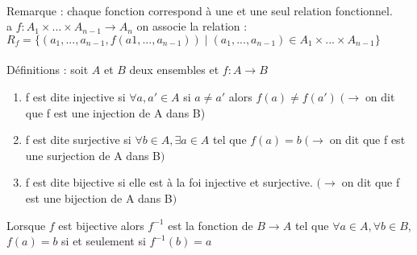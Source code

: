 \paragraph{}
Remarque : chaque fonction correspond à une et une seul relation fonctionnel.\\
a $f: A_1 \times ... \times A_{n-1} \to A_n$ on associe la relation :\\
$R_f = \{(a_1,...,a_{n-1}, f(a1,...,a_{n-1}))\;|\; (a_1,...,a_{n-1}) \in A_1 \times ... \times A_{n-1}\}$

\paragraph{}
Définitions : soit $A$ et $B$ deux ensembles et $f : A \to B$

\begin{enumerate}
	\item f est dite injective si $\forall a, a' \in A$ si $a \neq a'$ alors $f(a) \neq f(a')\;
	(\to\; $on dit que f est une injection de A dans B)
	\item f est dite surjective si $\forall b \in A, \exists a \in A $ tel que $f(a) = b\;
	(\to\; $on dit que f est une surjection de A dans B$)$
	\item f est dite bijective si elle est à la foi injective et surjective.
	$(\to\; $on dit que f est une bijection de A dans B$)$
\end{enumerate}

Lorsque $f$ est bijective alors $f^{-1}$ est la fonction de $B \to A$ tel que $\forall a \in A, \forall b \in B$, $f(a) = b$ si et seulement si $f^{-1}(b) = a$
